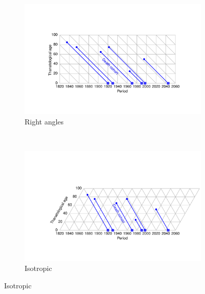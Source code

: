 \documentclass[12pt,oneside,letter]{article} %
\begin{document}
\begin{figure} 
\caption{A TPD diagram in two projections.}
\label{fig:TPD}
\centering
\begin{subfigure}{1.1\textwidth}
\caption{Right angles}
\vspace{-6em}
\label{fig:TPDrt}
\includegraphics[scale=0.6]{Figures/TPDrt.pdf}
\end{subfigure}
\\\vspace{-2em}
\begin{subfigure}{1.1\textwidth}
\caption{Isotropic}
\vspace{-6em}
\label{fig:TPDeq}
\includegraphics[scale=0.6]{Figures/TPDeq.pdf}
\end{subfigure}
\end{figure} 

\FloatBarrier
\end{document}
